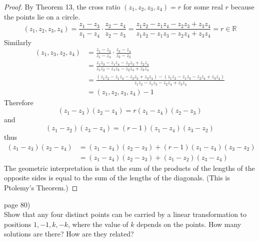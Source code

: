 \documentclass{article}
\newenvironment{problem}[2][Problem]{\begin{trivlist}
\item[\hskip \labelsep {\bfseries #1}\hskip \labelsep {\bfseries #2.}]}{\end{trivlist}}
\begin{document}
\begin{proof}
  By Theorem 13, the cross ratio $(z_1, z_2, z_3, z_4) = r$ for some real $r$ because the
  points lie on a circle. \[
    (z_1, z_2, z_3, z_4)
    = \frac{z_1 - z_3}{z_1 - z_4} \cdot \frac{z_2 - z_4}{z_2 - z_3}
    = \frac{z_1z_2 -z_1z_4 - z_2z_3 + z_3z_4}{z_1z_2 - z_1z_3 -z_2z_4 + z_3z_4}
    = r \in \mathbb{R}
  \] Similarly \begin{align*}
    (z_1, z_3, z_2, z_4)
    &= \frac{z_1 - z_2}{z_1 - z_4} \cdot \frac{z_3 - z_4}{z_3 - z_2} \\
    &= \frac{z_1z_3 -z_1z_4 - z_2z_3 + z_2z_4}{z_1z_2 - z_1z_3 -z_2z_4 + z_3z_4}\\
    &= \frac{(z_1z_2 -z_1z_4 - z_2z_3 + z_3z_4)-(z_1z_2 - z_1z_3 -z_2z_4 + z_3z_4)}{z_1z_2 - z_1z_3 -z_2z_4 + z_3z_4} \\
    &= (z_1, z_2, z_3, z_4) - 1
  \end{align*} Therefore \[
    (z_1 - z_3)(z_2 - z_4) = r(z_1 - z_4)(z_2 - z_3)
  \] and \[
    (z_1 - z_2)(z_3 - z_4) = (r - 1)(z_1 - z_4)(z_3 - z_2)
  \] thus \begin{align*}
    (z_1 - z_3)(z_2 - z_4) &= (z_1 - z_4)(z_2 - z_3) + (r - 1)(z_1 - z_4)(z_3 - z_2) \\
    &= (z_1 - z_4)(z_2 - z_3) + (z_1 - z_2)(z_3 - z_4)
  \end{align*}
  The geometric interpretation is that the sum of the products of the lengths of
  the opposite sides is equal to the sum of the lengths of the diagonals. (This is Ptolemy's Theorem.)
\end{proof}

\pagebreak

\begin{problem}{4} (page 80) \\
  Show that any four distinct points can be carried by a linear transformation
  to positions $1, -1, k, -k$, where the value of $k$ depends on the points.
  How many solutions are there? How are they related?
\end{problem}
\end{document}
